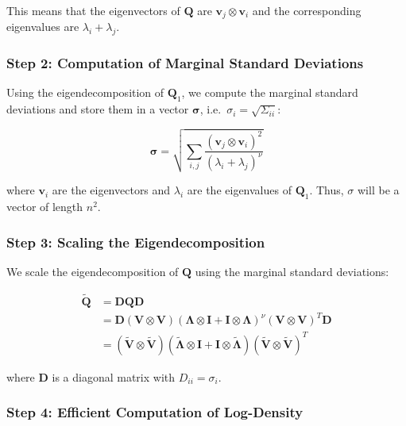 \documentclass[journal=,manuscript=]{achemso}
\begin{document}
This means that the eigenvectors of \(\mathbf{Q}\) are
\(\mathbf{v}_j \otimes \mathbf{v}_i\) and the corresponding eigenvalues
are \(\lambda_i + \lambda_j\).

\subsubsection{Step 2: Computation of Marginal Standard
Deviations}\label{step-2-computation-of-marginal-standard-deviations}

Using the eigendecomposition of \(\mathbf{Q}_1\), we compute the
marginal standard deviations and store them in a vector
\(\mathbf{\sigma}\), i.e.~\(\sigma_i = \sqrt{\Sigma_{ii}}\):

\[
\mathbf{\sigma} = \sqrt{\sum_{i,j} \frac{(\mathbf{v}_j \otimes \mathbf{v}_i)^2}{(\lambda_i + \lambda_j)^\nu}}
\]

where \(\mathbf{v}_i\) are the eigenvectors and \(\lambda_i\) are the
eigenvalues of \(\mathbf{Q}_1\). Thus, \(\sigma\) will be a vector of
length \(n^2\).

\subsubsection{Step 3: Scaling the
Eigendecomposition}\label{step-3-scaling-the-eigendecomposition}

We scale the eigendecomposition of \(\mathbf{Q}\) using the marginal
standard deviations:

\[
\begin{aligned}
\mathbf{\tilde  Q} &= \mathbf{D}\mathbf{Q}\mathbf{D} \\
&= \mathbf{D}(\mathbf{V} \otimes \mathbf{V})(\mathbf{\Lambda} \otimes \mathbf{I} + \mathbf{I} \otimes \mathbf{\Lambda})^\nu(\mathbf{V} \otimes \mathbf{V})^T\mathbf{D} \\
&= (\mathbf{\tilde V} \otimes \mathbf{\tilde V})(\mathbf{\tilde\Lambda} \otimes \mathbf{I} + \mathbf{I} \otimes \mathbf{\tilde \Lambda})(\mathbf{\tilde V} \otimes \mathbf{\tilde V})^T
\end{aligned}
\]

where \(\mathbf{D}\) is a diagonal matrix with \(D_{ii} = \sigma_i\).

\subsubsection{Step 4: Efficient Computation of
Log-Density}\label{step-4-efficient-computation-of-log-density}
\end{document}
